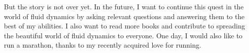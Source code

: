 But the story is not over yet. In the future, I want to continue this quest in the world of fluid dynamics by asking relevant questions and answering them to the best of my abilities. I also want to read more books and contribute to spreading the beautiful world of fluid dynamics to everyone. One day, I would also like to run a marathon, thanks to my recently acquired love for running. 



